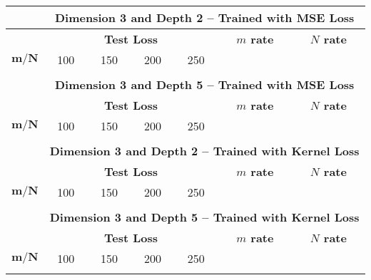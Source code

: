 \documentclass{article}
\newcommand{\Is}{N}
\begin{document}
\begin{adjustbox}{angle=90}
    \begin{tabular}{|c|cccc|cccc|cccc|}
        \hline
        & \multicolumn{12}{c|}{\bf Dimension 3 and Depth 2 -- Trained with MSE Loss} \\ \hline
        & \multicolumn{4}{c|}{\bf Test Loss} 
        & \multicolumn{4}{c|}{\bf $m$ rate}
        & \multicolumn{4}{c|}{\bf $N$ rate} \\ \hline
        {\bf $\boldsymbol{m}/\boldsymbol{\Is}$}  & 100 & 150 & 200 & 250 \\ \hline
         \\
        \hline
        \hline
        & \multicolumn{12}{c|}{\bf Dimension 3 and Depth 5 -- Trained with MSE Loss} \\ \hline
        & \multicolumn{4}{c|}{\bf Test Loss} 
        & \multicolumn{4}{c|}{\bf $m$ rate}
        & \multicolumn{4}{c|}{\bf $N$ rate} \\ \hline
        {\bf $\boldsymbol{m}/\boldsymbol{\Is}$}  & 100 & 150 & 200 & 250 \\ \hline
         \\
        \hline
        \hline
        & \multicolumn{12}{c|}{\bf Dimension 3 and Depth 2 -- Trained with Kernel Loss} \\ \hline
        & \multicolumn{4}{c|}{\bf Test Loss} 
        & \multicolumn{4}{c|}{\bf $m$ rate}
        & \multicolumn{4}{c|}{\bf $N$ rate} \\ \hline
        {\bf $\boldsymbol{m}/\boldsymbol{\Is}$}  & 100 & 150 & 200 & 250 \\ \hline
         \\
        \hline
        \hline
        & \multicolumn{12}{c|}{\bf Dimension 3 and Depth 5 -- Trained with Kernel Loss} \\ \hline
        & \multicolumn{4}{c|}{\bf Test Loss} 
        & \multicolumn{4}{c|}{\bf $m$ rate}
        & \multicolumn{4}{c|}{\bf $N$ rate} \\ \hline
        {\bf $\boldsymbol{m}/\boldsymbol{\Is}$}  & 100 & 150 & 200 & 250 \\ \hline
         \\
        \hline
    \end{tabular}
\end{adjustbox}
\end{document}
